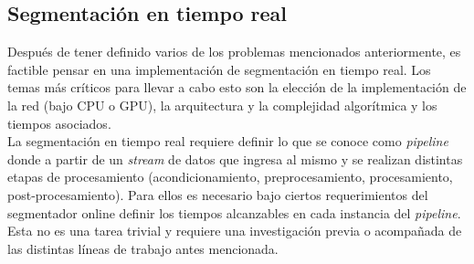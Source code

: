 \subsection*{Segmentación en tiempo real}

\indent Después de tener definido varios de los problemas mencionados anteriormente, es factible pensar en una
implementación de segmentación en tiempo real. Los temas más críticos para llevar a cabo esto son la elección de la
implementación de la red (bajo CPU o GPU), la arquitectura y la complejidad algorítmica y los tiempos asociados. \\
\indent La segmentación en tiempo real requiere definir lo que se conoce como \textit{pipeline} donde a partir de un
\textit{stream} de datos que ingresa al mismo y se realizan distintas etapas de procesamiento (acondicionamiento,
preprocesamiento, procesamiento, post-procesamiento). Para ellos es necesario bajo ciertos requerimientos del
segmentador online definir los tiempos alcanzables en cada instancia del \textit{pipeline}. Esta no es una tarea
trivial y requiere una investigación previa o acompañada de las distintas líneas de trabajo antes mencionada.
